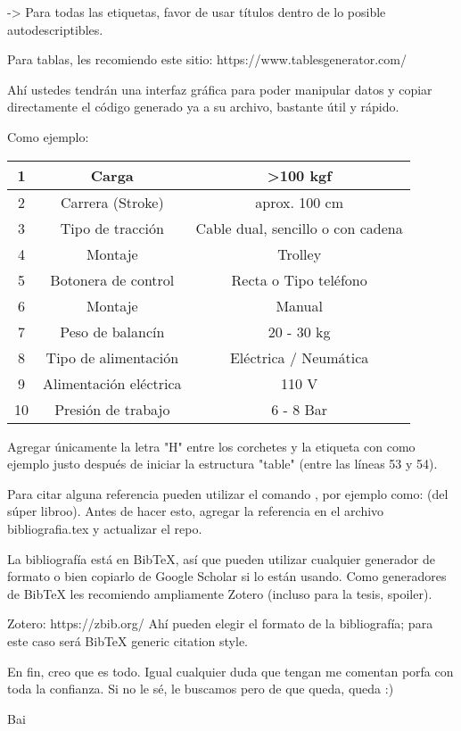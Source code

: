 -> Para todas las etiquetas, favor de usar títulos dentro de lo posible autodescriptibles. 


Para tablas, les recomiendo este sitio: https://www.tablesgenerator.com/

Ahí ustedes tendrán una interfaz gráfica para poder manipular datos y copiar
directamente el código generado ya a su archivo, bastante útil y rápido. 

Como ejemplo:

\begin{table}[]
    \begin{tabular}{|c|c|c|}
    \hline
    1  & Carga                  & \textgreater 100 kgf              \\ \hline
    2  & Carrera (Stroke)       & aprox. 100 cm                     \\ \hline
    3  & Tipo de tracción       & Cable dual, sencillo o con cadena \\ \hline
    4  & Montaje                & Trolley                           \\ \hline
    5  & Botonera de control    & Recta o Tipo teléfono             \\ \hline
    6  & Montaje                & Manual                            \\ \hline
    7  & Peso de balancín       & 20 - 30 kg                        \\ \hline
    8  & Tipo de alimentación   & Eléctrica / Neumática             \\ \hline
    9  & Alimentación eléctrica & 110 V                             \\ \hline
    10 & Presión de trabajo     & 6 - 8 Bar                         \\ \hline
    \end{tabular}
\end{table}


Agregar únicamente la letra "H" entre los corchetes y la etiqueta con \label{tb:tabla1} como ejemplo justo
después de iniciar la estructura "table" (entre las líneas 53 y 54).


Para citar alguna referencia pueden utilizar el comando \cite{}, por ejemplo como: 
\cite{3DMotion} (del súper libroo). Antes de hacer esto, agregar la referencia en 
el archivo bibliografia.tex y actualizar el repo. 

La bibliografía está en BibTeX, así que pueden utilizar cualquier generador de
formato o bien copiarlo de Google Scholar si lo están usando. 
Como generadores de BibTeX les recomiendo ampliamente Zotero (incluso para la tesis, spoiler).

Zotero: https://zbib.org/
Ahí pueden elegir el formato de la bibliografía; para este caso será BibTeX generic citation style. 

En fin, creo que es todo. Igual cualquier duda que tengan me comentan porfa con 
toda la confianza. Si no le sé, le buscamos pero de que queda, queda :)

Bai